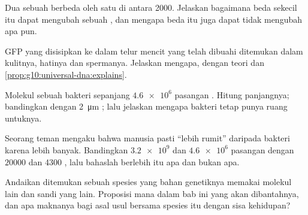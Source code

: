 \begin{exercise}[$\star\star$]\label{exo:g10:universal-dna:10}
Dua  sebuah  berbeda oleh satu  di antara 2000. Jelaskan
bagaimana beda sekecil itu dapat mengubah sebuah , dan mengapa
beda itu juga dapat tidak mengubah apa pun.
\end{exercise}

\begin{exercise}[$\star\star$]\label{exo:g10:universal-dna:11}
 GFP yang disisipkan ke dalam  telur mencit yang telah dibuahi
ditemukan dalam  kulitnya,  hatinya dan  spermanya. Jelaskan
mengapa, dengan teori  dan \cref{prop:g10:universal-dna:explains}.
\end{exercise}

\begin{exercise}[$\star\star\star$]\label{exo:g10:universal-dna:12}
Molekul  sebuah bakteri sepanjang $\num{4.6e6}$ pasangan .
Hitung panjangnya; bandingkan dengan \qty{2}{\micro m} ; lalu
jelaskan mengapa bakteri tetap punya ruang untuknya.
\end{exercise}

\begin{exercise}[$\star\star\star$]\label{exo:g10:universal-dna:13}
Seorang teman mengaku bahwa  manusia pasti ``lebih rumit'' daripada
 bakteri karena  lebih banyak. Bandingkan $\num{3.2e9}$ dan
$\num{4.6e6}$ pasangan  dengan $\num{20000}$ dan 4300 , lalu
bahaslah  berlebih itu apa dan bukan apa.
\end{exercise}

\begin{exercise}[$\star\star\star$]\label{exo:g10:universal-dna:14}
Andaikan ditemukan sebuah spesies yang bahan genetiknya memakai molekul
lain dan sandi yang lain. Proposisi mana dalam bab ini yang akan
dibantahnya, dan apa maknanya bagi asal usul bersama spesies itu dengan
sisa kehidupan?
\end{exercise}

